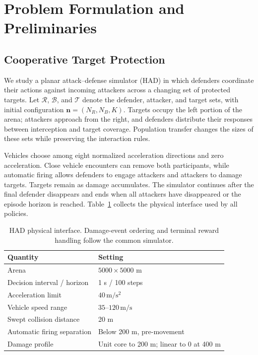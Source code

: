 \section{Problem Formulation and Preliminaries}
\label{sec:problem}
\subsection{Cooperative Target Protection}
We study a planar attack--defense simulator (HAD) in which defenders coordinate their actions against incoming attackers across a changing set of protected targets. Let $\mathcal R$, $\mathcal B$, and $\mathcal T$ denote the defender, attacker, and target sets, with initial configuration $\mathbf n=(N_R,N_B,K)$. Targets occupy the left portion of the arena; attackers approach from the right, and defenders distribute their responses between interception and target coverage. Population transfer changes the sizes of these sets while preserving the interaction rules.

Vehicles choose among eight normalized acceleration directions and zero acceleration. Close vehicle encounters can remove both participants, while automatic firing allows defenders to engage attackers and attackers to damage targets. Targets remain as damage accumulates. The simulator continues after the final defender disappears and ends when all attackers have disappeared or the episode horizon is reached. Table~\ref{tab:environment} collects the physical interface used by all policies.

\begin{table}[t]
\centering\footnotesize
\caption{HAD physical interface. Damage-event ordering and terminal reward handling follow the common simulator.}
\label{tab:environment}
\begin{tabular}{@{}ll@{}}\toprule
Quantity & Setting\\\midrule
Arena & $5000\times5000$ m\\
Decision interval / horizon & 1 s / 100 steps\\
Acceleration limit & $40\,\mathrm{m/s^2}$\\
Vehicle speed range & $35$--$120\,\mathrm{m/s}$\\
Swept collision distance & 20 m\\
Automatic firing separation & Below 200 m, pre-movement\\
Damage profile & Unit core to 200 m; linear to 0 at 400 m\\
\bottomrule\end{tabular}
\end{table}

